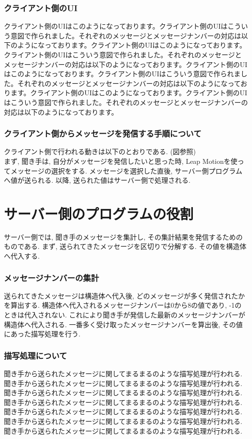 \documentclass{funthesis}
\begin{document}
\subsubsection{クライアント側のUI}
クライアント側のUIはこのようになっております。クライアント側のUIはこういう意図で作られました。それぞれのメッセージとメッセージナンバーの対応は以下のようになっております。クライアント側のUIはこのようになっております。クライアント側のUIはこういう意図で作られました。それぞれのメッセージとメッセージナンバーの対応は以下のようになっております。クライアント側のUIはこのようになっております。クライアント側のUIはこういう意図で作られました。それぞれのメッセージとメッセージナンバーの対応は以下のようになっております。クライアント側のUIはこのようになっております。クライアント側のUIはこういう意図で作られました。それぞれのメッセージとメッセージナンバーの対応は以下のようになっております。



\subsubsection{クライアント側からメッセージを発信する手順について}
クライアント側で行われる動きは以下のとおりである. (図参照)\\
まず, 聞き手は, 自分がメッセージを発信したいと思った時, Leap Motionを使ってメッセージの選択をする. メッセージを選択した直後, サーバー側プログラムへ値が送られる. 以降, 送られた値はサーバー側で処理される. 


\section{サーバー側のプログラムの役割}

サーバー側では, 聞き手のメッセージを集計し,  その集計結果を発信するためのものである.
まず, 送られてきたメッセージを区切りで分解する. その値を構造体へ代入する. 
\subsubsection{メッセージナンバーの集計}
送られてきたメッセージは構造体へ代入後, どのメッセージが多く発信されたかを算出する. 構造体へ代入されるメッセージナンバーは0から8の値であり, -1のときは代入されない. これにより聞き手が発信した最新のメッセージナンバーが構造体へ代入される. 一番多く受け取ったメッセージナンバーを算出後, その値にあった描写処理を行う.  

\subsubsection{描写処理について}
聞き手から送られたメッセージに関してまるまるのような描写処理が行われる.聞き手から送られたメッセージに関してまるまるのような描写処理が行われる.聞き手から送られたメッセージに関してまるまるのような描写処理が行われる.聞き手から送られたメッセージに関してまるまるのような描写処理が行われる.聞き手から送られたメッセージに関してまるまるのような描写処理が行われる.聞き手から送られたメッセージに関してまるまるのような描写処理が行われる.聞き手から送られたメッセージに関してまるまるのような描写処理が行われる.
\end{document}
